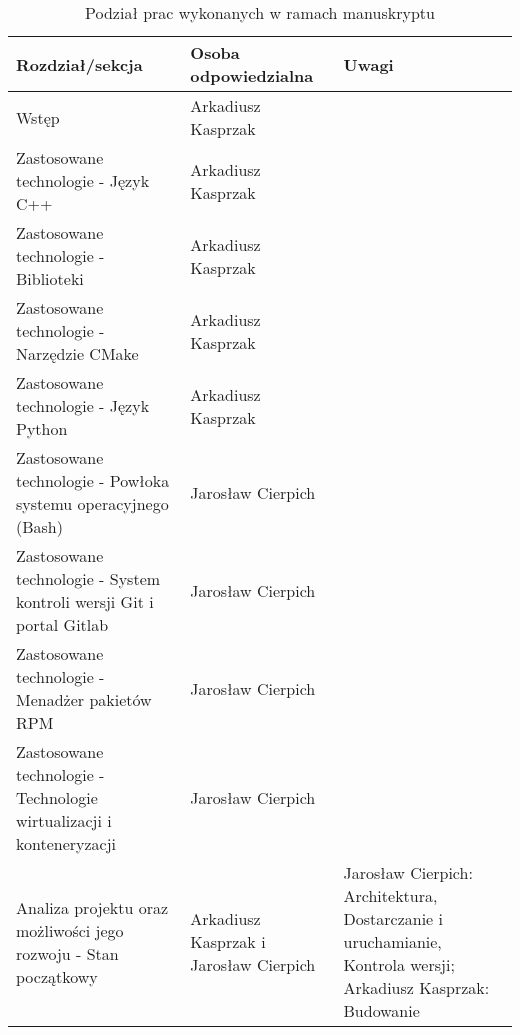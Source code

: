 \documentclass[12pt] {article}
\begin{document}
\begin{table*}[htbp]
\centering
\caption{Podział prac wykonanych w ramach manuskryptu}
\begin{tabularx}{\textwidth}{@{}XXX@{}}
\toprule
Rozdział/sekcja & 
Osoba odpowiedzialna & 
Uwagi \\ 

\midrule

Wstęp & Arkadiusz Kasprzak & \\
Zastosowane technologie - Język C++ & Arkadiusz Kasprzak & \\
Zastosowane technologie - Biblioteki & Arkadiusz Kasprzak & \\
Zastosowane technologie - Narzędzie CMake & Arkadiusz Kasprzak & \\
Zastosowane technologie - Język Python & Arkadiusz Kasprzak & \\
Zastosowane technologie - Powłoka systemu operacyjnego (Bash) & Jarosław Cierpich & \\
Zastosowane technologie - System kontroli wersji Git i portal Gitlab & Jarosław Cierpich & \\
Zastosowane technologie - Menadżer pakietów RPM & Jarosław Cierpich & \\
Zastosowane technologie - Technologie wirtualizacji i konteneryzacji & Jarosław Cierpich & \\
Analiza projektu oraz możliwości jego rozwoju - Stan początkowy & Arkadiusz Kasprzak i Jarosław Cierpich & Jarosław Cierpich: Architektura, Dostarczanie i uruchamianie, Kontrola wersji; Arkadiusz Kasprzak: Budowanie \\

\end{tabularx}
\end{table*}

\newpage
\end{document}
